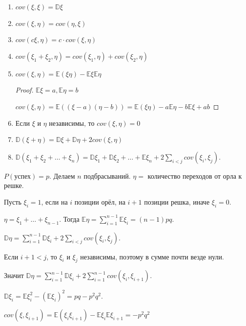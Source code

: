 \begin{properties}
    \begin{enumerate}
        \item {
            $cov (\xi, \xi) = \mathbb{D} \xi$
        }
        \item {
            $cov (\xi, \eta) = cov (\eta, \xi)$
        }
        \item {
            $cov (c\xi, \eta) = c \cdot cov (\xi, \eta)$
        }
        \item {
            $cov(\xi_1 + \xi_2, \eta) = cov(\xi_1, \eta) + cov(\xi_2, \eta)$
        }
        \item {
            $cov (\xi, \eta) = \mathbb{E} (\xi \eta) - \mathbb{E}\xi\mathbb{E}\eta$

            \begin{proof}
                $\mathbb{E} \xi = a, \mathbb{E} \eta = b$

                $cov(\xi, \eta) = \mathbb{E}((\xi - a)(\eta - b)) = \mathbb{E}(\xi \eta) - a\mathbb{E}\eta - b \mathbb{E} \xi + ab$
            \end{proof}
        }
        \item {
            Если $\xi$ и $\eta$ независимы, то $cov (\xi, \eta) = 0$
        }
        \item {
            $\mathbb{D} (\xi + \eta) = \mathbb{D} \xi + \mathbb{D} \eta + 2 cov (\xi, \eta)$
        }
        \item {
            $\mathbb{D} (\xi_1 + \xi_2 + \ldots + \xi_n) = \mathbb{D} \xi_1 + \mathbb{D} \xi_2 + \ldots + \mathbb{E} \xi_n + 2\sum_{i < j} cov(\xi_i, \xi_j)$.
        }
    \end{enumerate}
\end{properties}

\begin{example}
    $P(\text{успех}) = p$. Делаем $n$ подбрасываний. $\eta =$ количество переходов от орла к решке.

    Пусть $\xi_i = 1$, если на $i$ позиции орёл, на $i + 1$ позиции решка, иначе $\xi_i = 0$.

    $\eta = \xi_1 + \ldots + \xi_{n - 1}$. Тогда $\mathbb{E} \eta = \sum_{i = 1}^{n - 1} \mathbb{E} \xi_i = (n - 1)pq$.

    $\mathbb{D} \eta = \sum_{i = 1}^{n - 1} \mathbb{D}\xi_i + 2\sum_{i < j} cov(\xi_i, \xi_j)$.

    Если $i + 1 < j$, то $\xi_i$ и $\xi_j$ независимы, поэтому в сумме почти везде нули.

    Значит $\mathbb{D} \eta = \sum_{i = 1}^{n - 1} \mathbb{D}\xi_i + 2\sum_{i = 1}^{n - 1} cov(\xi_i, \xi_{i + 1})$.

    $\mathbb{D} \xi_i = \mathbb{E} \xi_i^2 - (\mathbb{E} \xi_i)^2 = pq - p^2q^2$.

    $cov(\xi, \xi_{i + 1}) = \mathbb{E} (\xi_i \xi_{i + 1}) - \mathbb{E} \xi_i \mathbb{E} \xi_{i + 1} = -p^2q^2$
\end{example}

